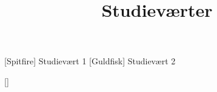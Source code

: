 \documentclass[a4paper,11pt]{article}
\title{Studieværter}
\author{}
\begin{document}
\maketitle

\begin{roles}
[Spitfire] Studievært 1
[Guldfisk] Studievært 2
\end{roles}

\begin{props}
[]
\end{props}

  
\begin{sketch}


\end{sketch}
\end{document}
